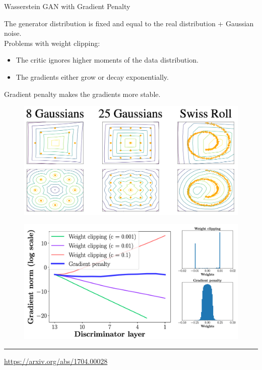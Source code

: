 \begin{frame}{Wasserstein GAN with Gradient Penalty}
	
	\begin{minipage}[t]{0.45\columnwidth}
		\vspace{0.2cm}
		The generator distribution is fixed and equal to the real distribution + Gaussian noise. \\
		Problems with weight clipping:
		\begin{itemize}
			\item The critic ignores higher moments of the data distribution.
			\item The gradients either grow or decay exponentially.
		\end{itemize}
	Gradient penalty makes the gradients  more stable.
	\end{minipage}%
	\begin{minipage}[t]{0.52\columnwidth}
		\begin{figure}
			\centering
			\includegraphics[width=0.95\linewidth]{figs/wgan_gp_toy}
		\end{figure}
		\begin{figure}
			\centering
			\includegraphics[width=0.95\linewidth]{figs/wgan_gp_weights}
		\end{figure}
	\end{minipage}
	
	\vfill
	\hrule\medskip 
	{\scriptsize \href{https://arxiv.org/abs/1704.00028}{https://arxiv.org/abs/1704.00028}}
	
\end{frame}
